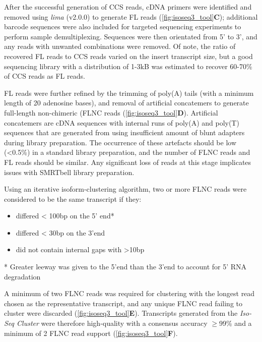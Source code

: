 After the successful generation of CCS reads, cDNA primers were identified and removed using \textit{lima} (v2.0.0) to generate FL reads (\cref{fig:isoseq3_tool}\textbf{C}); additional barcode sequences were also included for targeted sequencing experiments to perform sample demultiplexing. Sequences were then orientated from 5’ to 3’, and any reads with unwanted combinations were removed. Of note, the ratio of recovered FL reads to CCS reads varied on the insert transcript size, but a good sequencing library with a distribution of 1-3kB was estimated to recover 60-70\% of CCS reads as FL reads.   

FL reads were further refined by the trimming of poly(A) tails (with a minimum length of 20 adenosine bases), and removal of artificial concatemers to generate full-length non-chimeric (FLNC reads (\cref{fig:isoseq3_tool}\textbf{D}). Artificial concatemers are cDNA sequences with internal runs of poly(A) and poly(T) sequences that are generated from using insufficient amount of blunt adapters during library preparation. The occurrence of these artefacts should be low (<0.5\%) in a standard library preparation, and the number of FLNC reads and FL reads should be similar. Any significant loss of reads at this stage implicates issues with SMRTbell library preparation.

Using an iterative isoform-clustering algorithm, two or more FLNC reads were considered to be the same transcript if they: 
\begin{itemize}
	\item differed < 100bp on the 5’ end* 
	\item differed < 30bp on the 3’end 
	\item did not contain internal gaps with >10bp
\end{itemize}
* Greater leeway was given to the 5'end than the 3'end to account for 5' RNA degradation

A minimum of two FLNC reads was required for clustering with the longest read chosen as the representative transcript, and any unique FLNC read failing to cluster were discarded (\cref{fig:isoseq3_tool}\textbf{E}). Transcripts generated from the \textit{Iso-Seq Cluster} were therefore high-quality with a consensus accuracy $\geq$99\% and a minimum of 2 FLNC read support (\cref{fig:isoseq3_tool}\textbf{F}). 

